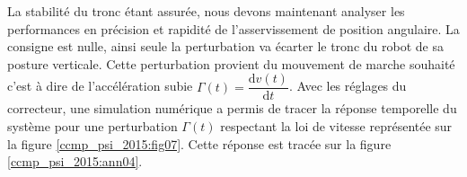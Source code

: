 %
%
%
%
%
%
%

\ifprof
\else
La stabilité du tronc étant assurée, nous devons maintenant analyser les performances en précision et rapidité de l'asservissement de position angulaire. La consigne est nulle, ainsi seule la perturbation va écarter le tronc du robot de sa posture verticale. Cette perturbation provient du mouvement de marche souhaité c'est à dire de l'accélération subie $\Gamma(t)=\dfrac{\mathrm{d}v(t)}{\mathrm{d}t}$. Avec les réglages du correcteur, une simulation numérique a permis de tracer la réponse temporelle du système pour une perturbation $\Gamma(t)$ respectant la loi de vitesse représentée sur la figure \ref{ccmp_psi_2015:fig07}. Cette réponse est tracée sur la figure \ref{ccmp_psi_2015:ann04}.



